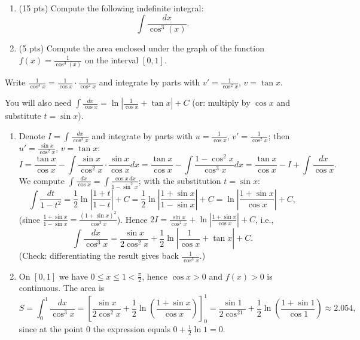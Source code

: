 
\begin{question}
\begin{enumerate}
  \item (15 pts) Compute the following indefinite integral:
  \[ \int\frac{dx}{\cos^3(x)}. \]
  \item (5 pts) Compute the area enclosed under the graph of the function $f(x)=\frac{1}{\cos^3(x)}$ on the interval $[0,1]$.
\end{enumerate}
\end{question}

\begin{hint}
Write $\frac{1}{\cos^3x}=\frac{1}{\cos x}\cdot\frac1{\cos^2x}$ and integrate by parts with $v'=\frac1{\cos^2x}$, $v=\tan x$.
\end{hint}

\begin{hint}
You will also need $\int\frac{dx}{\cos x}=\ln\left|\frac1{\cos x}+\tan x\right|+C$ (or: multiply by $\cos x$ and substitute $t=\sin x$).
\end{hint}

\begin{solution}
\begin{enumerate}
  \item Denote $I=\int\frac{dx}{\cos^3x}$ and integrate by parts with $u=\frac1{\cos x}$, $v'=\frac1{\cos^2x}$; then $u'=\frac{\sin x}{\cos^2x}$, $v=\tan x$:
  \[ I=\frac{\tan x}{\cos x}-\int\frac{\sin x}{\cos^2x}\cdot\frac{\sin x}{\cos x}dx=\frac{\tan x}{\cos x}-\int\frac{1-\cos^2x}{\cos^3x}dx=\frac{\tan x}{\cos x}-I+\int\frac{dx}{\cos x}. \]
  We compute $\int\frac{dx}{\cos x}=\int\frac{\cos x\,dx}{1-\sin^2x}$; with the substitution $t=\sin x$:
  \[ \int\frac{dt}{1-t^2}=\frac12\ln\left|\frac{1+t}{1-t}\right|+C=\frac12\ln\left|\frac{1+\sin x}{1-\sin x}\right|+C=\ln\left|\frac{1+\sin x}{\cos x}\right|+C, \]
  (since $\frac{1+\sin x}{1-\sin x}=\frac{(1+\sin x)^2}{\cos^2x}$). Hence $2I=\frac{\sin x}{\cos^2x}+\ln\left|\frac{1+\sin x}{\cos x}\right|+C$, i.e.,
  \[ \boxed{\int\frac{dx}{\cos^3x}=\frac{\sin x}{2\cos^2x}+\frac12\ln\left|\frac{1}{\cos x}+\tan x\right|+C.} \]
  (Check: differentiating the result gives back $\frac1{\cos^3x}$.)

  \item On $[0,1]$ we have $0\le x\le1<\frac\pi2$, hence $\cos x>0$ and $f(x)>0$ is continuous. The area is
  \[ S=\int_0^1\frac{dx}{\cos^3x}=\left[\frac{\sin x}{2\cos^2x}+\frac12\ln\left(\frac{1+\sin x}{\cos x}\right)\right]_0^1
      =\boxed{\frac{\sin1}{2\cos^21}+\frac12\ln\left(\frac{1+\sin1}{\cos1}\right)}\approx2.054, \]
  since at the point $0$ the expression equals $0+\frac12\ln1=0$.
\end{enumerate}
\end{solution}
